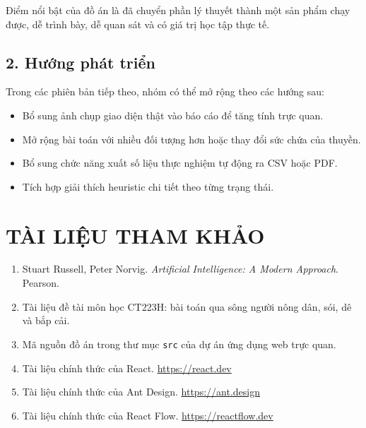 \documentclass[a4paper,12pt]{article}
\begin{document}
Điểm nổi bật của đồ án là đã chuyển phần lý thuyết thành một sản phẩm chạy được, dễ trình bày, dễ quan sát và có giá trị học tập thực tế.

\subsection*{2. Hướng phát triển}

Trong các phiên bản tiếp theo, nhóm có thể mở rộng theo các hướng sau:
\begin{itemize}
    \item Bổ sung ảnh chụp giao diện thật vào báo cáo để tăng tính trực quan.
    \item Mở rộng bài toán với nhiều đối tượng hơn hoặc thay đổi sức chứa của thuyền.
    \item Bổ sung chức năng xuất số liệu thực nghiệm tự động ra CSV hoặc PDF.
    \item Tích hợp giải thích heuristic chi tiết theo từng trạng thái.
\end{itemize}

\newpage
\section*{TÀI LIỆU THAM KHẢO}

\begin{enumerate}
    \item Stuart Russell, Peter Norvig. \textit{Artificial Intelligence: A Modern Approach}. Pearson.
    \item Tài liệu đề tài môn học CT223H: bài toán qua sông người nông dân, sói, dê và bắp cải.
    \item Mã nguồn đồ án trong thư mục \texttt{src} của dự án ứng dụng web trực quan.
    \item Tài liệu chính thức của React. \url{https://react.dev}
    \item Tài liệu chính thức của Ant Design. \url{https://ant.design}
    \item Tài liệu chính thức của React Flow. \url{https://reactflow.dev}
\end{enumerate}
\end{document}
